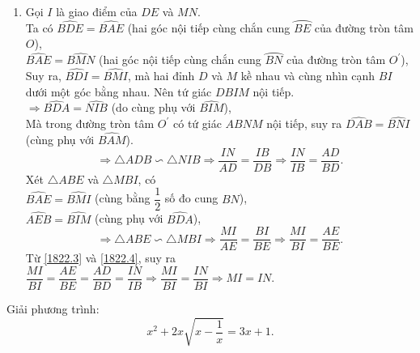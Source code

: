 \begin{ex}
{\begin{enumerate}
				\begin{equation}\label{1822.2}
					\Rightarrow \triangle ACD \backsim \triangle DCB \Rightarrow \dfrac{CD}{CB}= \dfrac{AD}{BD}.
				\end{equation}
				Từ \eqref{1822.1} và \eqref{1822.2}, suy ra $\dfrac{AE}{BE}= \dfrac{AD}{BD} \Leftrightarrow AE \cdot BD= AD \cdot BE$.
				\item Gọi $I$ là giao điểm của $DE$ và $MN$.\\
				Ta có $\widehat{BDE}= \widehat{BAE}$ (hai góc nội tiếp cùng chắn cung $\wideparen{BE}$ của đường tròn tâm $O$),\\
				$\widehat{BAE}= \widehat{BMN}$ (hai góc nội tiếp cùng chắn cung $\wideparen{BN}$ của đường tròn tâm $O^{'}$),\\
				Suy ra, $\widehat{BDI}= \widehat{BMI}$, mà hai đỉnh $D$ và $M$ kề nhau và cùng nhìn cạnh $BI$ dưới một góc bằng nhau. Nên tứ giác $DBIM$ nội tiếp.\\
				$\Rightarrow \widehat{BDA}= \widehat{NIB}$ (do cùng phụ với $\widehat{BIM}$),\\
				Mà trong đường tròn tâm $O^{'}$ có tứ giác $ABNM$ nội tiếp, suy ra $\widehat{DAB}= \widehat{BNI}$ (cùng phụ với $\widehat{BAM}$).\\
				\begin{equation}\label{1822.3}
					\Rightarrow \triangle ADB \backsim \triangle NIB \Rightarrow \dfrac{IN}{AD}= \dfrac{IB}{DB} \Rightarrow \dfrac{IN}{IB}= \dfrac{AD}{BD}.
				\end{equation}
				Xét $\triangle ABE$ và $\triangle MBI$, có\\
				$\widehat{BAE}= \widehat{BMI}$ (cùng bằng $\dfrac{1}{2}$ số đo cung $BN$),\\
				$\widehat{AEB}= \widehat{BIM}$ (cùng phụ với $\widehat{BDA}$),\\
				\begin{equation}\label{1822.4}
					\Rightarrow \triangle ABE \backsim \triangle MBI \Rightarrow \dfrac{MI}{AE}= \dfrac{BI}{BE} \Rightarrow \dfrac{MI}{BI}= \dfrac{AE}{BE}.
				\end{equation}
				Từ \eqref{1822.3} và \eqref{1822.4}, suy ra $\dfrac{MI}{BI}= \dfrac{AE}{BE}= \dfrac{AD}{BD}= \dfrac{IN}{IB} \Rightarrow \dfrac{MI}{BI}= \dfrac{IN}{BI} \Rightarrow MI= IN.$
				
			\end{enumerate}
	}
\end{ex}
\begin{ex}%
	Giải phương trình:
	$$x^2+2x\sqrt{x-\dfrac{1}{x}}=3x+1.$$
\end{ex}
